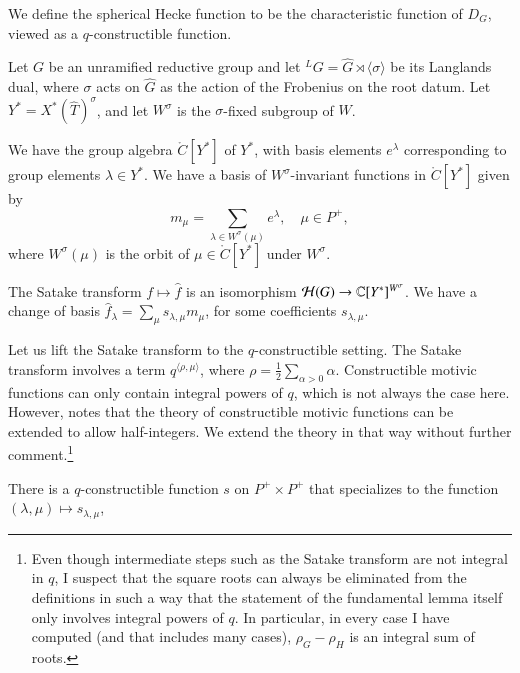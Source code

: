 We define the spherical Hecke function to be the characteristic function of $D_G$, viewed as a $q$-constructible function.

Let $G$ be an unramified reductive group and let ${}^LG = \hat G\rtimes \langle \sigma\rangle$ be its Langlands dual, where
$\sigma$ acts on $\hat G$ as the action of the Frobenius on the root datum.
Let $Y^* = X^*(\hat T)^\sigma$, and let $W^\sigma$
is the $\sigma$-fixed subgroup of $W$.   

We have  the group algebra $\ring{C}[Y^*]$ of $Y^*$, with basis elements
$e^\lambda$ corresponding to group elements $\lambda\in Y^*$.
We have a basis of $W^\sigma$-invariant functions in $\ring{C}[Y^*]$ given by
\[
m_\mu = \sum_{\lambda\in W^\sigma(\mu)} e^\lambda, \quad \mu\in P^+,
\]
where $W^\sigma(\mu)$ is the orbit of $\mu\in\ring{C}[Y^*]$ under $W^\sigma$.

The Satake transform $f\mapsto \hat f$
is an isomorphism  $\mathcal H(G)\to\mathbb{C}[Y^*]^{W^\sigma}$.
We have a change of basis $\hat f_\lambda = \sum_\mu s_{\lambda,\mu} m_\mu$, for some coefficients $s_{\lambda,\mu}$.

Let us lift the Satake transform to the $q$-constructible setting.  The Satake transform involves
a term $q^{\langle\rho,\mu\rangle}$, where $\rho = \frac{1}{2} \sum_{\alpha > 0} \alpha$.   Constructible motivic functions
can only contain integral powers of $q$, which is not always the case here.  However, \cite{XX} notes
that the theory of constructible motivic functions can be extended to allow half-integers.  We extend
the theory in that way without further comment.\footnote{Even though intermediate steps such as the 
Satake transform are not integral in $q$, 
I suspect that the square roots can always be
eliminated from the definitions in such a way that the statement of the fundamental lemma itself only
involves integral powers of $q$.  In particular,
in every case I have computed (and that includes many cases), $\rho_G - \rho_H$ is an integral sum of roots.}

\begin{lemma}\label{lemma:satake} There is a $q$-constructible function $s$ on $P^+\times P^+$ that
specializes to the function $(\lambda,\mu)\mapsto s_{\lambda,\mu}$,
\end{lemma}

